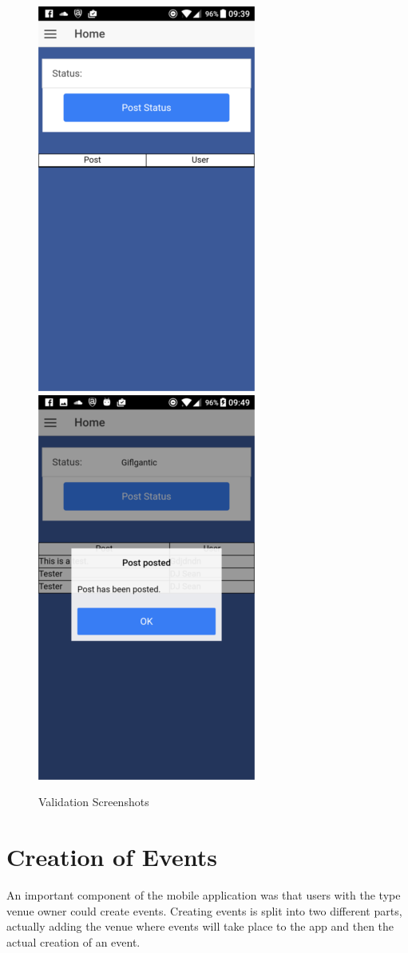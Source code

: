 \begin{figure}[H]
\includegraphics[scale=0.5]{images/sc10}
\includegraphics[scale=0.5]{images/sc11}
\caption{Validation Screenshots}
\end{figure}

\section{Creation of Events}
An important component of the mobile application was that users with the type venue owner could create events. Creating events is split into two different parts, actually adding the venue where events will take place to the app and then the actual creation of an event.

